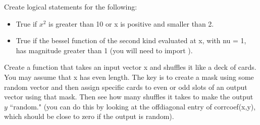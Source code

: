 \begin{problem}
Create logical statements for the following:
\begin{itemize}
\item True if $x^2$ is greater than 10 or x is positive and smaller than 2.
\item True if the bessel function of the second kind evaluated at x, with nu = 1, has magnitude greater than 1 (you will need to import ).
\end{itemize}
\end{problem}

\begin{problem}
Create a function that takes an input vector x and shuffles it like a deck of cards. You may assume that x has even length. The key is to create a mask using some random vector and then assign specific cards to even or odd slots of an output vector using that mask. Then see how many shuffles it takes to make the output $y$ ``random." (you can do this by looking at the offdiagonal entry of corrcoef(x,y), which should be close to zero if the output is random).
\end{problem}

